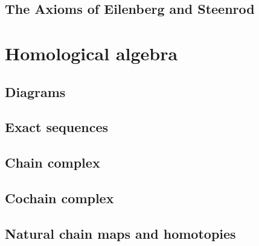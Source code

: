 \documentclass[11pt]{book} %
\begin{document}
\section{The Axioms of Eilenberg and Steenrod}


\chapter{Homological algebra}
\section{Diagrams}
\section{Exact sequences}
\section{Chain complex}
\section{Cochain complex}
\section{Natural chain maps and homotopies}
\end{document}
